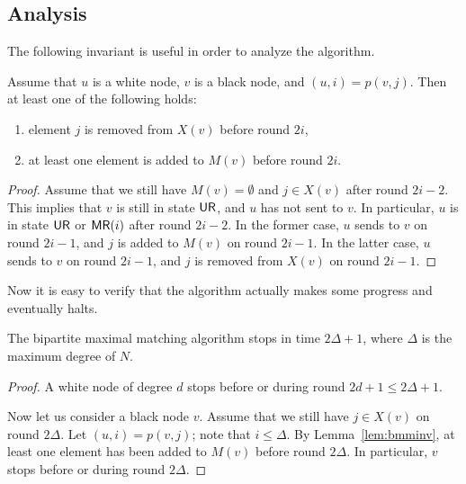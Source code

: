 \subsection{Analysis}

The following invariant is useful in order to analyze the algorithm.
\begin{lemma}\label{lem:bmminv}
    Assume that $u$ is a white node, $v$ is a black node, and $(u,i) = p(v,j)$. Then at least one of the following holds:
    \begin{enumerate}[noitemsep]
        \item element $j$ is removed from $X(v)$ before round $2i$,
        \item at least one element is added to $M(v)$ before round $2i$.
    \end{enumerate}
\end{lemma}
\begin{proof}
    Assume that we still have $M(v) = \emptyset$ and $j \in X(v)$ after round $2i-2$. This implies that $v$ is still in state $\textup{\sffamily UR}$, and $u$ has not sent  to $v$. In particular, $u$ is in state $\textup{\sffamily UR}$ or $\textup{\sffamily MR}(i)$ after round $2i-2$. In the former case, $u$ sends  to $v$ on round $2i-1$, and $j$ is added to $M(v)$ on round $2i-1$. In the latter case, $u$ sends  to $v$ on round $2i-1$, and $j$ is removed from $X(v)$ on round $2i-1$.
\end{proof}

Now it is easy to verify that the algorithm actually makes some progress and eventually halts.
\begin{lemma}\label{lem:bmm-time}
    The bipartite maximal matching algorithm stops in time $2\Delta+1$, where $\Delta$ is the maximum degree of $N$.
\end{lemma}
\begin{proof}
    A white node of degree $d$ stops before or during round $2d+1 \le 2\Delta+1$.
    
    Now let us consider a black node $v$. Assume that we still have $j \in X(v)$ on round $2\Delta$. Let $(u,i) = p(v,j)$; note that $i \le \Delta$. By Lemma~\ref{lem:bmminv}, at least one element has been added to $M(v)$ before round $2\Delta$. In particular, $v$ stops before or during round $2\Delta$.
\end{proof}

